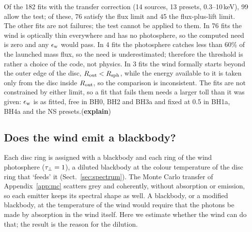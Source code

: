 Of the 182 fits with the transfer correction (14 sources, 13 presets, 0.3--10\,keV), 99 allow the test; of these, 76 satisfy the flux limit and 45 the flux-plus-lift limit.
The other fits are not failures; the test cannot be applied to them.
In 76 fits the wind is optically thin everywhere and has no photosphere, so the computed need is zero and any $\epsilon_{\rm w}$ would pass.
In 4 fits the photosphere catches less than 60\% of the launched mass flux, so the need is underestimated; therefore the threshold is rather a choice of the code, not physics.
In 3 fits the wind formally starts beyond the outer edge of the disc, $R_{\rm out} < R_{\rm sph}$, while the energy available to it is taken only from the disc inside $R_{\rm out}$, so the comparison is inconsistent.
The fits are not constrained by either limit, so a fit that fails them needs a larger toll than it was given: $\epsilon_{\rm w}$ is as fitted, free in BH0, BH2 and BH3a and fixed at 0.5 in BH1a, BH4a and the NS presets.(\textbf{explain})


\subsection{Does the wind emit a blackbody?}
\label{sec:disc:thermalization}

Each disc ring is assigned with  a blackbody and each ring of the wind photosphere ($\tau_\perp = 1$), a diluted blackbody at the colour temperature of the disc ring that `feeds' it (Sect.~\ref{sec:spectrum}).
The Monte Carlo transfer of Appendix~\ref{app:mc} scatters grey and coherently, without absorption or emission, so each emitter keeps its spectral shape as well.
A blackbody, or a modified blackbody, at the temperature of the wind would require that the photons be made by absorption in the wind itself.
Here we estimate whether the wind can do that; the result is the reason for the dilution.

